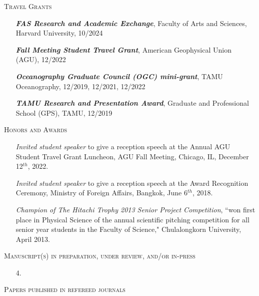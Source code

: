\documentclass[10pt]{article}
\newcommand{\margintext}[1]{\marginnote{\normalsize\textbf #1 |}}
\begin{document}
\textsc{Travel Grants}
\begin{itemize}[leftmargin=*]
    \item[] \emph{\textbf{FAS Research and Academic Exchange}}, Faculty of Arts and Sciences, Harvard University, 10/2024
    \item[] \emph{\textbf{Fall Meeting Student Travel Grant}}, American Geophysical Union (AGU), 12/2022
    \item[] \emph{\textbf{Oceanography Graduate Council (OGC) mini-grant}}, TAMU Oceanography, 12/2019, 12/2021, 12/2022 
    \item[] \emph{\textbf{TAMU Research and Presentation Award}}, Graduate and Professional School (GPS), TAMU, 12/2019
\end{itemize} 
\bigskip
\bigskip
\textsc{Honors and Awards}
\begin{itemize}[leftmargin=*]
    \item[] \emph{Invited student speaker} to give a reception speech at the Annual AGU Student Travel Grant Luncheon, AGU Fall Meeting, Chicago, IL, December 12$^{th}$, 2022.
    \item[] \emph{Invited student speaker} to give a reception speech at the Award Recognition Ceremony, Ministry of Foreign Affairs, Bangkok, June 6$^{th}$, 2018.
    \item[] \emph{Champion of The Hitachi Trophy 2013 Senior Project Competition}, ``won first place in Physical Science of the annual scientific pitching competition for all senior year students in the Faculty of Science," Chulalongkorn University, April 2013.
\end{itemize}

\bigskip
\margintext{Publications} \textsc{Manuscript(s) in preparation, under review, and/or in-press}
\begin{enumerate}
\item[4.] 
\end{enumerate}

\bigskip
\textsc{Papers published in refereed journals}
\begin{etaremune}
\item {}
\item {}
\item {}
\end{etaremune}
\end{document}
